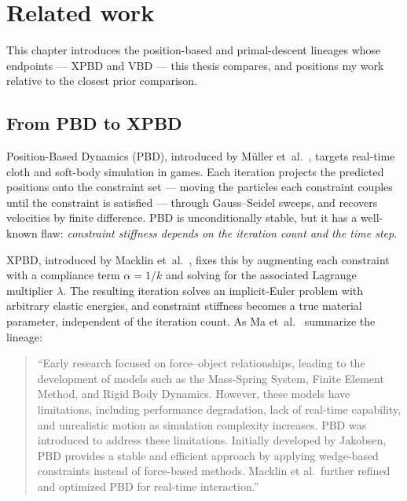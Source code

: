 \chapter{Related work}
\label{chap:RelatedWork}

This chapter introduces the position-based and primal-descent lineages whose
endpoints --- XPBD and VBD --- this thesis compares, and positions my work
relative to the closest prior comparison.

\section{From PBD to XPBD}
\label{sec:PBDtoXPBD}
Position-Based Dynamics (PBD), introduced by M\"uller et~al.~\cite{MULLER2007109},
targets real-time cloth and soft-body simulation in games. Each iteration
projects the predicted positions onto the constraint set --- moving the particles
each constraint couples until the constraint is satisfied --- through
Gauss--Seidel sweeps, and recovers velocities by finite difference. PBD is unconditionally stable, but it has a
well-known flaw: \emph{constraint stiffness depends on the iteration count and the
time step}.

XPBD, introduced by Macklin et~al.~\cite{10.1145/2994258.2994272}, fixes this by
augmenting each constraint with a compliance term $\alpha = 1/k$ and solving for
the associated Lagrange multiplier $\lambda$. The resulting iteration solves an
implicit-Euler problem with arbitrary elastic energies, and constraint stiffness
becomes a true material parameter, independent of the iteration count. As Ma
et~al.~\cite{app142311072} summarize the lineage:

\begin{quote}
``Early research focused on force--object relationships, leading to the
development of models such as the Mass-Spring System, Finite Element Method,
and Rigid Body Dynamics. However, these models have limitations,
including performance degradation, lack of real-time capability, and unrealistic
motion as simulation complexity increases. PBD was introduced to address these
limitations. Initially developed by Jakobsen, PBD provides a stable and
efficient approach by applying wedge-based constraints instead of force-based
methods. Macklin et al.\ further refined and optimized PBD for real-time
interaction.''
\end{quote}

